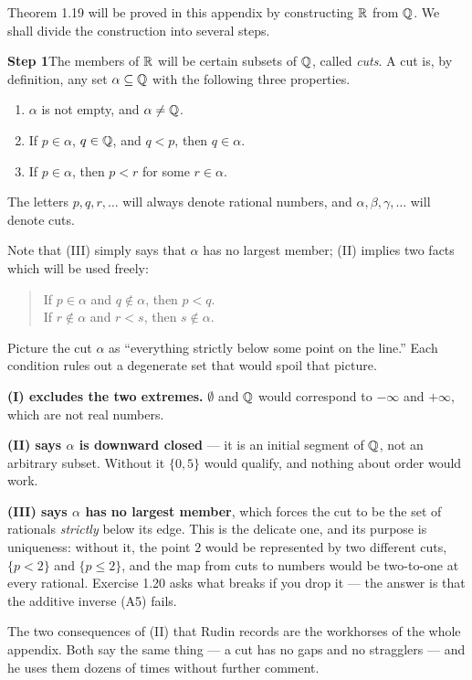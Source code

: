 \noindent
Theorem 1.19 will be proved in this appendix by constructing $\mathbb{R}$ from $\mathbb{Q}$. We
shall divide the construction into several steps.

\medskip
\noindent\textbf{Step 1}\quad The members of $\mathbb{R}$ will be certain subsets of
$\mathbb{Q}$, called \emph{cuts}. A cut is, by definition, any set $\alpha \subseteq \mathbb{Q}$
with the following three properties.
\begin{enumerate}[label=(\Roman*), leftmargin=2.6em, itemsep=2pt, topsep=4pt]
  \item $\alpha$ is not empty, and $\alpha \ne \mathbb{Q}$.
  \item If $p \in \alpha$, $q \in \mathbb{Q}$, and $q < p$, then $q \in \alpha$.
  \item If $p \in \alpha$, then $p < r$ for some $r \in \alpha$.
\end{enumerate}
The letters $p,q,r,\dots$ will always denote rational numbers, and
$\alpha,\beta,\gamma,\dots$ will denote cuts.

Note that (III) simply says that $\alpha$ has no largest member; (II) implies
two facts which will be used freely:
\begin{quote}
If $p \in \alpha$ and $q \notin \alpha$, then $p < q$.\\
If $r \notin \alpha$ and $r < s$, then $s \notin \alpha$.
\end{quote}

\begin{unpack}
Picture the cut $\alpha$ as ``everything strictly below some point on the
line.'' Each condition rules out a degenerate set that would spoil that picture.

\smallskip
\textbf{(I) excludes the two extremes.} $\emptyset$ and $\mathbb{Q}$ would correspond to
$-\infty$ and $+\infty$, which are not real numbers.

\smallskip
\textbf{(II) says $\alpha$ is downward closed} --- it is an initial segment of
$\mathbb{Q}$, not an arbitrary subset. Without it $\{0,5\}$ would qualify, and nothing
about order would work.

\smallskip
\textbf{(III) says $\alpha$ has no largest member}, which forces the cut to be
the set of rationals \emph{strictly} below its edge. This is the delicate one,
and its purpose is uniqueness: without it, the point $2$ would be represented by
two different cuts, $\{p<2\}$ and $\{p\le 2\}$, and the map from cuts to numbers
would be two-to-one at every rational. Exercise 1.20 asks what breaks if you
drop it --- the answer is that the additive inverse (A5) fails.

\smallskip
The two consequences of (II) that Rudin records are the workhorses of the whole
appendix. Both say the same thing --- a cut has no gaps and no stragglers ---
and he uses them dozens of times without further comment.
\end{unpack}


